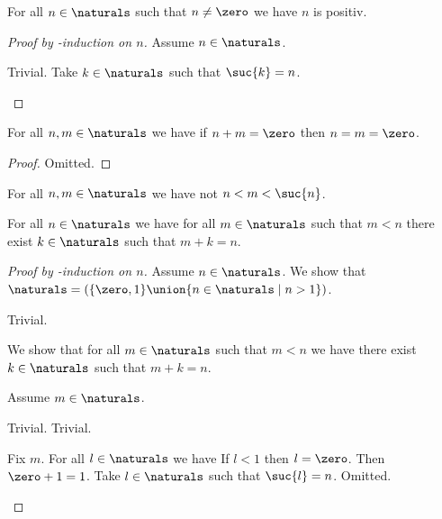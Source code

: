 \begin{proposition}\label{naturals_are_positiv_besides_zero}
    For all $n \in \naturals$ such that $n \neq \zero$ we have $n$ is positiv.
\end{proposition}
\begin{proof}[Proof by \in-induction on $n$]
    Assume $n \in \naturals$.
    \begin{byCase}
         Trivial.
            Take $k \in \naturals$ such that $\suc{k} = n$.
    \end{byCase}
\end{proof}



\begin{proposition}\label{naturals_sum_eq_zero}
    For all $n,m \in \naturals$ we have if $n+m = \zero$ then $n = m = \zero$.
\end{proposition}
\begin{proof}
    Omitted.
\end{proof}

\begin{proposition}\label{no_natural_between_n_and_suc_n}
    For all $n,m \in \naturals$ we have not $n < m < \suc{n}$.
\end{proposition}

\begin{proposition}\label{naturals_rless_existence_of_lesser_natural}
    For all $n \in \naturals$ we have for all $m \in \naturals$ such that $m < n$ there exist $k \in \naturals$ such that $m + k = n$.
\end{proposition}
\begin{proof}[Proof by \in-induction on $n$]
    Assume $n \in \naturals$.
    We show that $\naturals = (\{\zero, 1\} \union \{n \in \naturals \mid n > 1\})$.
    \begin{subproof}
        Trivial.
    \end{subproof}
    \begin{byCase}
            
            We show that for all $m \in \naturals$ such that $m < n$ we have there exist $k \in \naturals$ such that $m + k = n$.
            \begin{subproof}
                Assume $m \in \naturals$.
                \begin{byCase}
                        Trivial.
                        Trivial.
                \end{byCase}
            \end{subproof}
            Fix $m$.
            For all $l \in \naturals$ we have If $l < 1$ then $l = \zero$.
            Then $\zero + 1 = 1$.
            Take $l \in \naturals$ such that $\suc{l} = n$.
            Omitted.
    \end{byCase}
\end{proof}


